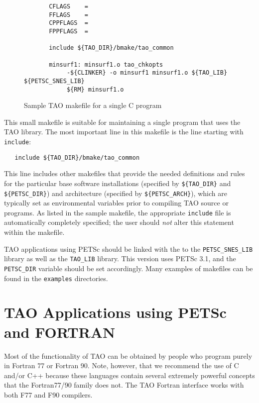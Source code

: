 \begin{figure}[tbh]
{\footnotesize
\begin{verbatim}   
       CFLAGS    = 
       FFLAGS    = 
       CPPFLAGS  =
       FPPFLAGS  =
       
       include ${TAO_DIR}/bmake/tao_common
   
       minsurf1: minsurf1.o tao_chkopts
            -${CLINKER} -o minsurf1 minsurf1.o ${TAO_LIB} ${PETSC_SNES_LIB}
            ${RM} minsurf1.o
\end{verbatim} 
\noindent
}
\caption{Sample TAO makefile for a single C program}
\label{fig:make3}
\end{figure}

This small makefile is suitable for maintaining a single program that
uses the TAO library.  The most important line in this makefile is the
line starting with {\tt include}:

\begin{verbatim}
   include ${TAO_DIR}/bmake/tao_common
\end{verbatim}
\noindent %
This line includes other makefiles that provide the needed definitions
and rules for the particular base software installations (specified by
{\tt \$\{TAO\_DIR\}} and {\tt \$\{PETSC\_DIR\}}) and architecture
(specified by {\tt \$\{PETSC\_ARCH\}}), which are typically set as
environmental variables prior to compiling TAO source or programs.  As
listed in the sample makefile, the appropriate {\tt include} file is
automatically completely specified; the user should {\em not} alter
this statement within the makefile.
 
TAO applications using PETSc should be linked with the
to the {\tt PETSC\_SNES\_LIB} library
as well as the {\tt TAO\_LIB} library. This version uses
PETSc 3.1, and the {\tt PETSC\_DIR} variable
should be set accordingly.  Many examples of makefiles
can be found in the {\tt examples} directories.


\section{TAO Applications using PETSc and FORTRAN}
\label{chapter:petscfapp}

Most of the functionality of TAO can be obtained by people who program
purely in Fortran 77 or Fortran 90.  Note, however, that we recommend
the use of C and/or C++ because these languages contain several
extremely powerful concepts that the Fortran77/90 family does not.
The TAO Fortran interface works with both F77 and F90 compilers.

